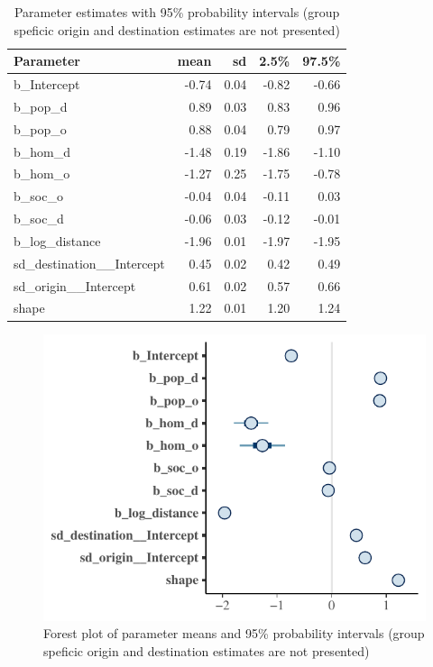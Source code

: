 \documentclass[fleqn,10pt]{SelfArx} %
\begin{document}
{{%
\begin{table}[ht]
  \centering
  \caption{Parameter estimates with 95\% probability intervals (group speficic origin and destination estimates are not presented)}
  \label{tab:coef}
  \begin{tabular}{lrrrr}
    \toprule
    Parameter & mean & sd & 2.5\% & 97.5\% \\ 
    \midrule
    b\_Intercept & -0.74 & 0.04 & -0.82 & -0.66 \\ 
    b\_pop\_d & 0.89 & 0.03 & 0.83 & 0.96 \\ 
    b\_pop\_o & 0.88 & 0.04 & 0.79 & 0.97 \\ 
    b\_hom\_d & -1.48 & 0.19 & -1.86 & -1.10 \\ 
    b\_hom\_o & -1.27 & 0.25 & -1.75 & -0.78 \\ 
    b\_soc\_o & -0.04 & 0.04 & -0.11 & 0.03 \\ 
    b\_soc\_d & -0.06 & 0.03 & -0.12 & -0.01 \\ 
    b\_log\_distance & -1.96 & 0.01 & -1.97 & -1.95 \\ 
    sd\_destination\_\_Intercept & 0.45 & 0.02 & 0.42 & 0.49 \\ 
    sd\_origin\_\_Intercept & 0.61 & 0.02 & 0.57 & 0.66 \\ 
    shape & 1.22 & 0.01 & 1.20 & 1.24 \\ 
    \bottomrule
  \end{tabular}
\end{table}

\begin{figure}
  \includegraphics[width = \columnwidth]{../fig/forestplot.pdf}
  \caption{Forest plot of parameter means and 95\% probability
    intervals (group speficic origin and destination estimates are not
    presented)}
  \label{fig:forestplot}
\end{figure}

}}
\end{document}
